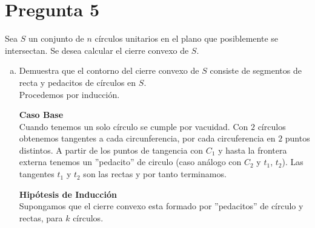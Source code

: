 \large\section*{Pregunta 5}\Large

Sea $S$ un conjunto de $n$ círculos unitarios en el plano que posiblemente se intersectan. 
Se desea calcular el cierre convexo  de $S$.

\begin{enumerate}[a)]
\item Demuestra que el contorno del cierre convexo de $S$ consiste de segmentos de recta y 
pedacitos de círculos en $S$.\\

Procedemos por inducción.

\textbf{Caso Base}\\ 
Cuando tenemos un solo círculo se 
cumple por vacuidad. Con $2$ círculos obtenemos tangentes a cada circunferencia, por cada
circuferencia en $2$ puntos distintos. A partir de los puntos de tangencia con $C_1$ y hasta
la frontera externa tenemos un ''pedacito'' de circulo (caso análogo con $C_2$ y $t_1$, $t_2$).
Las tangentes $t_1$ y $t_2$ son las rectas y por tanto terminamos.

\textbf{Hipótesis de Inducción}\\
Supongamos que el cierre convexo esta formado por ''pedacitos'' de círculo y rectas, para $k$ círculos.


\end{enumerate}
